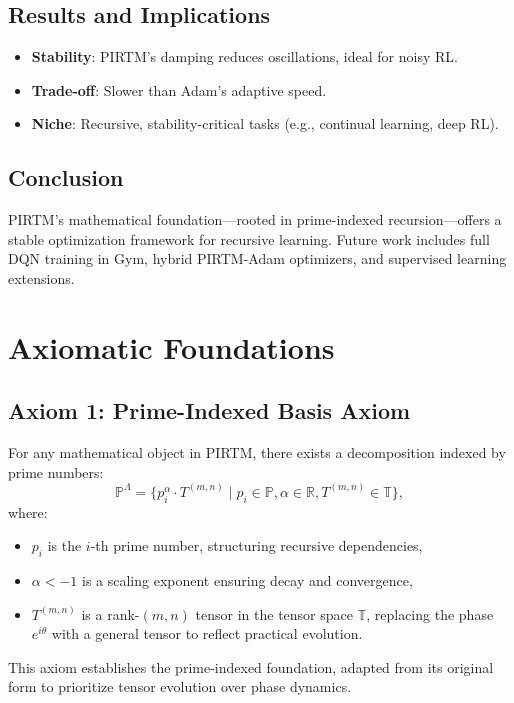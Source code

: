 \documentclass{article}
\theoremstyle{plain}
\begin{document}
\subsection{Results and Implications}
\begin{itemize}
    \item \textbf{Stability}: PIRTM’s damping reduces oscillations, ideal for noisy RL.
    \item \textbf{Trade-off}: Slower than Adam’s adaptive speed.
    \item \textbf{Niche}: Recursive, stability-critical tasks (e.g., continual learning, deep RL).
\end{itemize}

\subsection{Conclusion}
PIRTM’s mathematical foundation—rooted in prime-indexed recursion—offers a stable optimization framework for recursive learning. Future work includes full DQN training in Gym, hybrid PIRTM-Adam optimizers, and supervised learning extensions.


\section{Axiomatic Foundations}

\subsection{Axiom 1: Prime-Indexed Basis Axiom}
For any mathematical object in PIRTM, there exists a decomposition indexed by prime numbers:
\begin{equation}
    \mathbb{P}^\Lambda = \{ p_i^\alpha \cdot T^{(m,n)} \mid p_i \in \mathbb{P}, \alpha \in \mathbb{R}, T^{(m,n)} \in \mathbb{T} \},
\end{equation}
where:
\begin{itemize}
    \item \( p_i \) is the \( i \)-th prime number, structuring recursive dependencies,
    \item \( \alpha < -1 \) is a scaling exponent ensuring decay and convergence,
    \item \( T^{(m,n)} \) is a rank-$(m,n)$ tensor in the tensor space \( \mathbb{T} \), replacing the phase \( e^{i\theta} \) with a general tensor to reflect practical evolution.
\end{itemize}
This axiom establishes the prime-indexed foundation, adapted from its original form to prioritize tensor evolution over phase dynamics.
\end{document}
